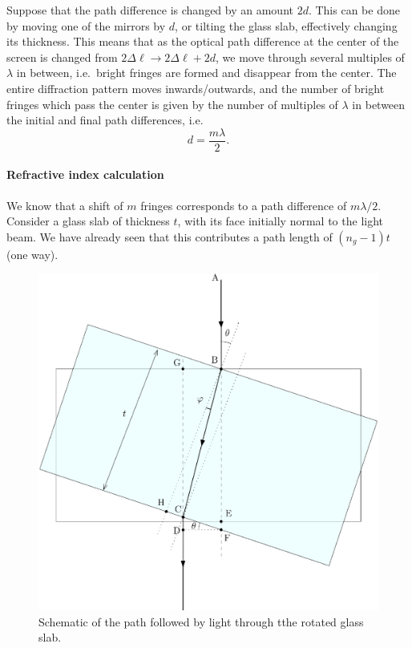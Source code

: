 \documentclass[11pt]{article}
\begin{document}
        Suppose that the path difference is changed by an amount $2d$. This can be done by moving one of the mirrors by $d$, or tilting the glass slab,
        effectively changing its thickness. This means that as the optical path difference at the center of the screen is changed
        from $2\Delta\ell \to 2\Delta\ell + 2d$, we move through several multiples of $\lambda$ in between, i.e.\ bright fringes are formed
        and disappear from the center. The entire diffraction pattern moves inwards/outwards, and the number of bright fringes which pass the center
        is given by the number of multiples of $\lambda$ in between the initial and final path differences, i.e.\ 
        \[
                d = \frac{m\lambda}{2}.
        \]

        \paragraph{Refractive index calculation}
        We know that a shift of $m$ fringes corresponds to a path difference of $m\lambda/2$.
        Consider a glass slab of thickness $t$, with its face initially normal to the light beam. We have already seen that this contributes
        a path length of $(n_g - 1)t$ (one way).

        \begin{figure}[H]
        \centering
                \includegraphics[scale=0.7]{./slab.eps}
        \caption{Schematic of the path followed by light through tthe rotated glass slab.}
        \label{fig:slab}
        \end{figure}
\end{document}
